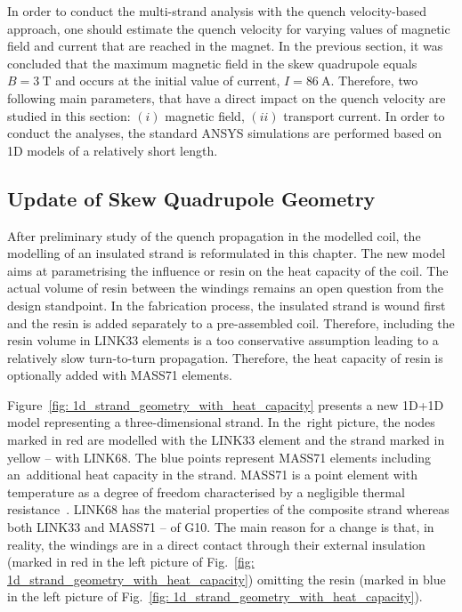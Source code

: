 
In order to conduct the multi-strand analysis with the quench velocity-based approach, one should estimate the quench velocity for varying values of magnetic field and current that are reached in the magnet. In the previous section, it was concluded that the maximum magnetic field in the skew quadrupole equals $B=3~\text{T}$ and occurs at the initial value of current, $I=86~\text{A}$. Therefore, two following main parameters, that have a direct impact on the quench velocity are studied in this section: $(i)$ magnetic field, $(ii)$ transport current. In order to conduct the analyses, the standard ANSYS simulations are performed based on 1D models of a relatively short length.

\subsection{Update of Skew Quadrupole Geometry}
\label{subsection:update_skew_quadrupole_geometry}

After preliminary study of the quench propagation in the modelled coil, the modelling of an insulated strand is reformulated in this chapter. The new model aims at parametrising the influence or resin on the heat capacity of the coil. The actual volume of resin between the windings remains an open question from the design standpoint. In the fabrication process, the insulated strand is wound first and the resin is added separately to a pre-assembled coil. Therefore, including the resin volume in LINK33 elements is a too conservative assumption leading to a relatively slow turn-to-turn propagation. Therefore, the heat capacity of resin is optionally added with MASS71 elements.

Figure~\ref{fig: 1d_strand_geometry_with_heat_capacity} presents a new 1D+1D model representing a three-dimensional strand. In the~right picture, the nodes marked in red are modelled with the LINK33 element and the strand marked in yellow -- with LINK68. The blue points represent MASS71 elements including an~additional heat capacity in the strand. MASS71 is a point element with temperature as a degree of freedom characterised by a negligible thermal resistance~\cite{ansys_element_manual}. LINK68 has the material properties of the composite strand whereas both LINK33 and MASS71 -- of G10. The main reason for a change is that, in reality, the windings are in a direct contact through their external insulation (marked in red in the left picture of Fig.~\ref{fig: 1d_strand_geometry_with_heat_capacity}) omitting the resin (marked in blue in the left picture of Fig.~\ref{fig: 1d_strand_geometry_with_heat_capacity}). 

